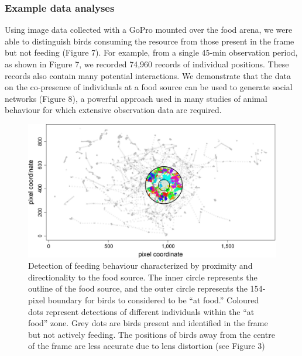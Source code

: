 \documentclass[11pt,a4paper,oneside]{article}
\begin{document}
\subsubsection{Example data analyses}
Using image data collected with a GoPro mounted over the food arena, we were able to distinguish birds consuming the resource from those present in the frame but not feeding (Figure 7). For example, from a single 45‐min observation period, as shown in Figure 7, we recorded 74,960 records of individual positions. These records also contain many potential interactions. We demonstrate that the data on the co‐presence of individuals at a food source can be used to generate social networks (Figure 8), a powerful approach used in many studies of animal behaviour for which extensive observation data are required.

\begin{figure}
    \centering
    \includegraphics{Graving_IMPRS_Thesis/figures/bird_figure_7.jpg}
    \caption{Detection of feeding behaviour characterized by proximity and directionality to the food source. The inner circle represents the outline of the food source, and the outer circle represents the 154‐pixel boundary for birds to considered to be “at food.” Coloured dots represent detections of different individuals within the “at food” zone. Grey dots are birds present and identified in the frame but not actively feeding. The positions of birds away from the centre of the frame are less accurate due to lens distortion (see Figure 3)
}
    \label{fig:bird_figure_7}
\end{figure}
\end{document}
